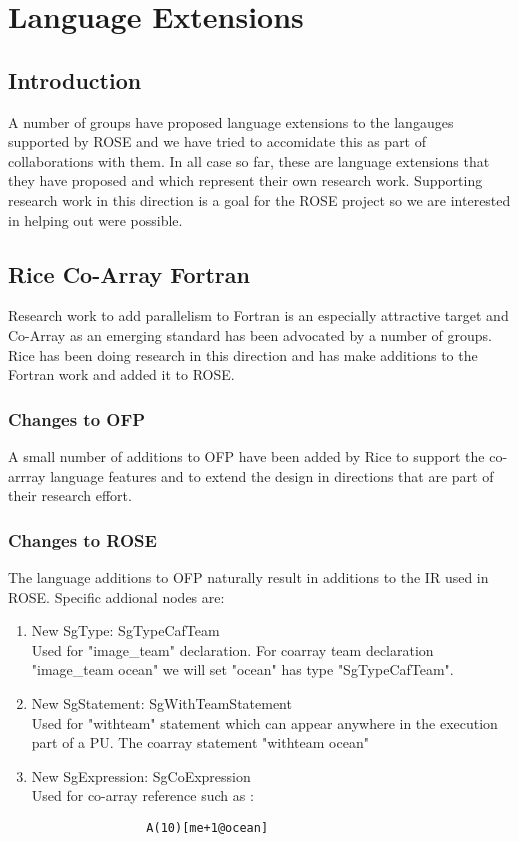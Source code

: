 
\chapter{Language Extensions}
\label{languageExtensions::overview}

\section{Introduction}

   A number of groups have proposed language extensions to the langauges
supported by ROSE and we have tried to accomidate this as part of 
collaborations with them.  In all case so far, these are language
extensions that they have proposed and which represent their own research 
work.  Supporting research work in this direction is a goal for the ROSE
project so we are interested in helping out were possible.

\section{Rice Co-Array Fortran}
   Research work to add parallelism to Fortran is an especially attractive
target and Co-Array as an emerging standard has been advocated by a number of groups.
Rice has been doing research in this direction and has make additions to the
Fortran work and added it to ROSE.

\subsection{Changes to OFP}
    A small number of additions to OFP have been added by Rice to support
the co-arrray language features and to extend the design in directions that
are part of their research effort.  

\subsection{Changes to ROSE}
    The language additions to OFP naturally result in additions to the
IR used in ROSE.  Specific addional nodes are:
\begin{enumerate}
   \item New SgType: SgTypeCafTeam \\
          Used for "image_team" declaration. For coarray team declaration "image_team ocean" we will set "ocean" has type "SgTypeCafTeam".

   \item New SgStatement: SgWithTeamStatement \\
          Used for "withteam" statement which can appear anywhere in the execution part of a PU. The coarray statement "withteam ocean"

   \item New SgExpression: SgCoExpression \\
          Used for co-array reference such as :
\begin{verbatim}
                A(10)[me+1@ocean]
\end{verbatim}
\end{enumerate}

